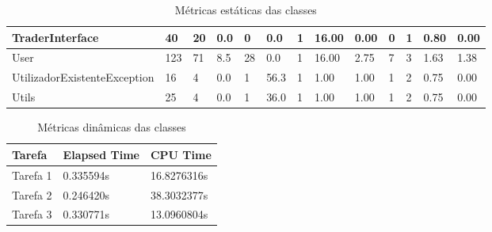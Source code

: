 \begin{table}[ht]
\begin{adjustbox}{width=1\textwidth}
\begin{tabular}{|l|l|l|l|l|l|l|l|l|l|l|l|l|}
TraderInterface              & 40           & 20         & 0.0             & 0        & 0.0            & 1       & 16.00           & 0.00                       & 0                   & 1                   & 0.80               & 0.00               \\ \hline
User                         & 123          & 71         & 8.5             & 28       & 0.0            & 1       & 16.00           & 2.75                       & 7                   & 3                   & 1.63               & 1.38               \\ \hline
UtilizadorExistenteException & 16           & 4          & 0.0             & 1        & 56.3           & 1       & 1.00            & 1.00                       & 1                   & 2                   & 0.75               & 0.00               \\ \hline
Utils                        & 25           & 4          & 0.0             & 1        & 36.0           & 1       & 1.00            & 1.00                       & 1                   & 2                   & 0.75               & 0.00               \\ \hline
\end{tabular}
\end{adjustbox}
\caption{Métricas estáticas das classes}
\end{table}

\begin{table}[]
\centering
\begin{tabular}{|l|l|l|}
\hline
Tarefa   & Elapsed Time & CPU Time    \\ \hline
Tarefa 1 & 0.335594s    & 16.8276316s \\ \hline
Tarefa 2 & 0.246420s    & 38.3032377s \\ \hline
Tarefa 3 & 0.330771s    & 13.0960804s \\ \hline
\end{tabular}
\caption{Métricas dinâmicas das classes}
\end{table}
